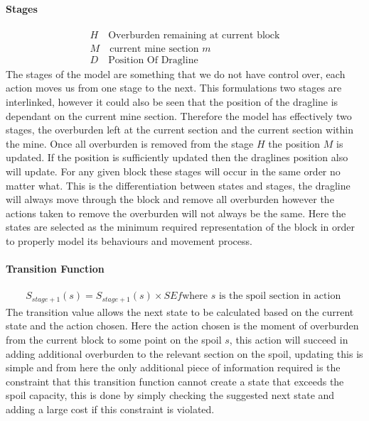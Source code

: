 \paragraph*{Stages}
\begin{align}
\label{DP:Stage0}
H \quad \text{Overburden remaining at current block}\\
\label{DP:Stage1}
M \quad \text{current mine section }m \\ 
\label{DP:stage2}
D \quad \text{Position Of Dragline}
\end{align}
The stages of the model are something that we do not have control over, each action moves us from one stage to the next. This formulations two stages are interlinked, however it could also be seen that the position of the dragline is dependant on the current mine section. Therefore the model has effectively two stages, the overburden left at the current section and the current section within the mine. Once all overburden is removed from the stage $H$ the position $M$ is updated. If the position is sufficiently updated then the draglines position also will update. For any given block these stages will occur in the same order no matter what. This is the differentiation between states and stages, the dragline will always move through the block and remove all overburden however the actions taken to remove the overburden will not always be the same. Here the states are selected as the minimum required representation of the block in order to properly model its behaviours and movement process. 	
\paragraph*{Transition Function}
\begin{align}
\label{Transition}
S_{stage+1}(s)=S_{stage+1}(s)\times SEf  \text{where $s$ is the spoil section in action }
\end{align}
The transition value allows the next state to be calculated based on the current state and the action chosen. Here the action chosen is the moment of overburden from the current block to some point on the spoil $s$, this action will succeed in adding additional overburden to the relevant section on the spoil, updating this is simple and from here the only additional piece of information required is the constraint that this transition function cannot create a state that exceeds the spoil capacity, this is done by simply checking the suggested next state and adding a large cost if this constraint is violated. 

